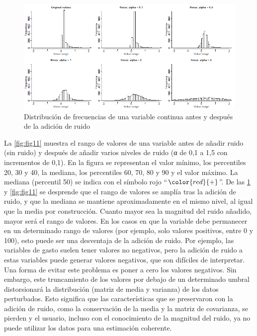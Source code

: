 \documentclass[]{book}
\theoremstyle{definition}
\theoremstyle{definition}
\theoremstyle{definition}
\theoremstyle{definition}
\theoremstyle{remark}
\begin{document}
\begin{figure}
\includegraphics[width=1\linewidth]{Imagenes/image9} \caption{Distribución de frecuencias de una variable continua antes y después de la adición de ruido}\label{fig:fig10}
\end{figure}

La \ref{fig:fig11} muestra el rango de valores de una variable antes de añadir ruido (sin ruido) y después de añadir varios niveles de ruido (α de 0,1 a 1,5 con incrementos de 0,1). En la figura se representan el valor mínimo, los percentiles 20, 30 y 40, la mediana, los percentiles 60, 70, 80 y 90 y el valor máximo. La mediana (percentil 50) se indica con el símbolo rojo ``\(\color {red}{\text{+}}\)''. De las \ref{fig:fig10} y \ref{fig:fig11} se desprende que el rango de valores se amplía tras la adición de ruido, y que la mediana se mantiene aproximadamente en el mismo nivel, al igual que la media por construcción. Cuanto mayor sea la magnitud del ruido añadido, mayor será el rango de valores. En los casos en que la variable debe permanecer en un determinado rango de valores (por ejemplo, solo valores positivos, entre 0 y 100), esto puede ser una desventaja de la adición de ruido. Por ejemplo, las variables de gasto suelen tener valores no negativos, pero la adición de ruido a estas variables puede generar valores negativos, que son difíciles de interpretar. Una forma de evitar este problema es poner a cero los valores negativos. Sin embargo, este truncamiento de los valores por debajo de un determinado umbral distorsionará la distribución (matriz de media y varianza) de los datos perturbados. Esto significa que las características que se preservaron con la adición de ruido, como la conservación de la media y la matriz de covarianza, se pierden y el usuario, incluso con el conocimiento de la magnitud del ruido, ya no puede utilizar los datos para una estimación coherente.
\end{document}
